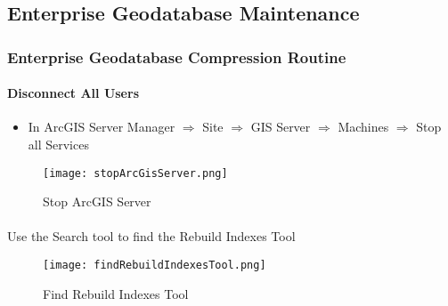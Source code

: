 \documentclass[class=article , crop=false, titlepage, twoside, multi={itemize, figure, verbatim}, float=false]{standalone}
\title{}  %
\begin{document}


\ifstandalone
\maketitle %
\tableofcontents %
\clearpage
\fi

\subsection{Enterprise Geodatabase Maintenance}

\subsubsection{Enterprise Geodatabase Compression Routine}

\paragraph[Disconnect Users]{Disconnect All Users\texorpdfstring{\\}{}}
\begin{itemize}
  \item In {\Large ArcGIS Server Manager $\Rightarrow$  Site $\Rightarrow$ GIS Server $\Rightarrow$ Machines $\Rightarrow$ Stop all Services}
\end{itemize}
\begin{figure}[h!]
\centering
    \texttt{[image: stopArcGisServer.png]}

\vspace*{-10mm}\caption{Stop ArcGIS Server}

\end{figure}
\paragraph*{}Use the Search tool to find the Rebuild Indexes Tool
\begin{figure}[h!]
\centering
    \texttt{[image: findRebuildIndexesTool.png]}

\vspace*{-10mm}\caption{Find Rebuild Indexes Tool}

\end{figure}
\clearpage
%
%
%
%
\end{document}
